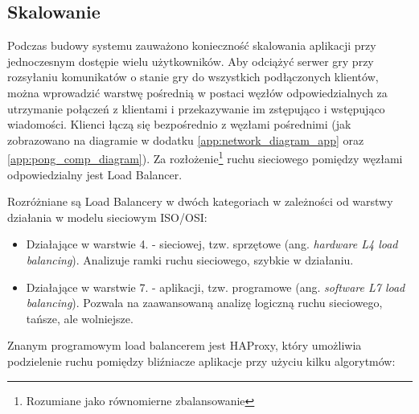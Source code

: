 \subsection{Skalowanie}
\label{subsub:scalability}

Podczas budowy systemu zauważono konieczność skalowania aplikacji przy jednoczesnym dostępie wielu użytkowników. Aby odciążyć serwer gry przy rozsyłaniu komunikatów o stanie gry do wszystkich podłączonych klientów, można wprowadzić warstwę pośrednią w postaci węzłów odpowiedzialnych za utrzymanie połączeń z klientami i przekazywanie im zstępująco i wstępująco wiadomości. Klienci łączą się bezpośrednio z węzłami pośrednimi (jak zobrazowano na diagramie w dodatku \ref{app:network_diagram_app} oraz \ref{app:pong_comp_diagram}). Za rozłożenie\footnote{Rozumiane jako równomierne zbalansowanie} ruchu sieciowego pomiędzy węzłami odpowiedzialny jest Load Balancer.

Rozróżniane są Load Balancery w dwóch kategoriach w zależności od warstwy działania w modelu sieciowym ISO/OSI:
\begin{itemize}
	\item Działające w warstwie 4. - sieciowej, tzw. sprzętowe (ang. \emph{hardware L4 load balancing}). Analizuje ramki ruchu sieciowego, szybkie w działaniu.
	\item Działające w warstwie 7. - aplikacji, tzw. programowe (ang. \emph{software L7 load balancing}). Pozwala na zaawansowaną analizę logiczną ruchu sieciowego, tańsze, ale wolniejsze.
\end{itemize}

Znanym programowym load balancerem jest HAProxy, który umożliwia podzielenie ruchu pomiędzy bliźniacze aplikacje przy użyciu kilku algorytmów\cite{haproxy-conf}:


